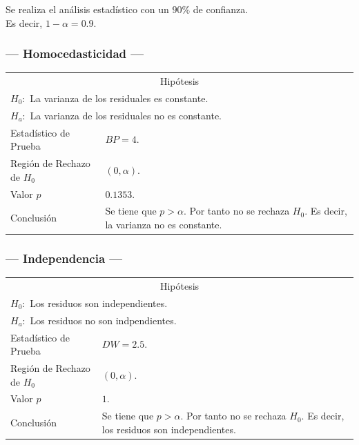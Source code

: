 Se realiza el análisis estadístico con un \(90\%\) de confianza. \\ 
Es decir, \(1- \alpha = 0.9\).

\subsubsection{--- Homocedasticidad ---} %
\begin{center}
  \begin{tabular}{|l|p{8cm}|}
    \cline{1-2}
    \multicolumn{2}{|c|}{Hipótesis}\\ \cline{1-2}
    \multicolumn{2}{|l|}{\(H_0:\) La varianza de los residuales es constante.} \\ 
    \multicolumn{2}{|l|}{\(H_a:\) La varianza de los residuales no es constante.} \\ \cline{1-2}
    Estadístico de Prueba & \(BP = 4\).\\ \cline{1-2} 
		Región de Rechazo de \(H_0\) & \((0, \alpha )\).\\ \cline{1-2} 
    Valor \(p\) & \(0.1353\).\\ \cline{1-2} 
    Conclusión & Se tiene que \(p> \alpha\). \newline 
		Por tanto no se rechaza \(H_0\). \newline 
		Es decir, la varianza no es constante. \\ \cline{1-2} 
  \end{tabular}
\end{center}

\subsubsection{--- Independencia ---} %
\begin{center}
  \begin{tabular}{|l|p{8cm}|}
    \cline{1-2}
    \multicolumn{2}{|c|}{Hipótesis}\\ \cline{1-2}
    \multicolumn{2}{|l|}{\(H_0:\) Los residuos son independientes.} \\ 
    \multicolumn{2}{|l|}{\(H_a:\) Los residuos no son indpendientes.} \\ \cline{1-2}
    Estadístico de Prueba & \(DW = 2.5\).\\ \cline{1-2} 
		Región de Rechazo de \(H_0\) & \((0, \alpha )\).\\ \cline{1-2} 
    Valor \(p\) & \(1\).\\ \cline{1-2} 
    Conclusión & Se tiene que \(p> \alpha\). \newline 
		Por tanto no se rechaza \(H_0\). \newline 
		Es decir, los residuos son independientes.\\ \cline{1-2} 
  \end{tabular}
\end{center}

